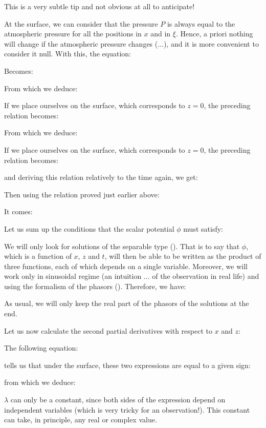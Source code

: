 	This is a very subtle tip and not obvious at all to anticipate!

	At the surface, we can consider that the pressure $P$ is always equal to the atmospheric pressure for all the positions in $x$ and in $\xi$. Hence, a priori nothing will change if the atmospheric pressure changes (...), and it is more convenient to consider it null. With this, the equation:
	
	Becomes:
	
	From which we deduce:
	
	If we place ourselves on the surface, which corresponds to $z=0$, the preceding relation becomes:
	
	From which we deduce:
	
	If we place ourselves on the surface, which corresponds to $z=0$, the preceding relation becomes:
		
	and deriving this relation relatively to the time again, we get:
	
	Then using the relation proved just earlier above:
	
	It comes:
	
	Let us sum up the conditions that the scalar potential $\phi$ must satisfy:
	
	We will only look for solutions of the separable type (). That is to say that $\phi$, which is a function of $x$, $z$ and $t$, will then be able to be written as the product of three functions, each of which depends on a single variable. Moreover, we will work only in sinusoidal regime (an intuition ... of the observation in real life) and using the formalism of the phasors (). Therefore, we have:
	
	As usual, we will only keep the real part of the phasors of the solutions at the end. 

	Let us now calculate the second partial derivatives with respect to $x$ and $z$:
		
	The following equation:
	
	tells us that under the surface, these two expressions are equal to a given sign:
	
	from which we deduce:
	
	$\lambda$ can only be a constant, since both sides of the expression depend on independent variables (which is very tricky for an observation!). This constant can take, in principle, any real or complex value.

